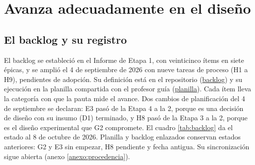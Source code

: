 \chapter{Avanza adecuadamente en el diseño}
\label{cap:avance}

\section{El backlog y su registro}
\label{sec:backlog}

El backlog se estableció en el Informe de Etapa 1, con veinticinco ítems en siete épicas, y
se amplió el 4 de septiembre de 2026 con nueve tareas de proceso (H1 a H9), pendientes de
adopción. Su definición está en el repositorio (\href{run:../evidence/research/backlog/README.md}{backlog}) y su
ejecución en la planilla compartida con el profesor guía (\href{https://docs.google.com/spreadsheets/d/1FXSB_2WqGL2TbOgw698gQEBTbL3nV7qXFypcflpYgEw/edit?gid=313395138}{planilla}).
Cada ítem lleva la categoría con que la pauta mide el avance. Dos cambios de
planificación del 4 de septiembre se declaran: E3 pasó de la Etapa 4 a la 2, porque es una
decisión de diseño con su insumo (D1) terminado, y H8 pasó de la Etapa 3 a la 2, porque es el
diseño experimental que G2 compromete. El cuadro \ref{tab:backlog} da el estado al 8 de
octubre de 2026. Planilla y backlog enlazados conservan estados anteriores: G2 y E3 sin empezar,
H8 pendiente y fecha antigua. Su sincronización sigue abierta (anexo
\ref{anexo:procedencia}).


